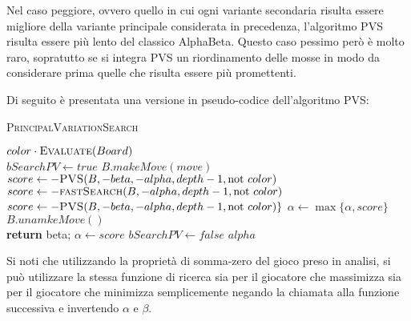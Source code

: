 \documentclass[a4paper]{article}
\begin{document}
Nel caso peggiore, ovvero quello in cui ogni variante secondaria risulta essere
migliore della variante principale considerata in precedenza, l'algoritmo PVS 
risulta essere più lento del classico AlphaBeta. Questo caso pessimo però è 
molto raro, sopratutto se si integra PVS un riordinamento delle mosse in modo
da considerare prima quelle che risulta essere più promettenti.

Di seguito è presentata una versione in pseudo-codice dell'algoritmo PVS:

\begin{algorithm}[H]
  \caption{\textsc{PrincipalVariationSearch}}
  \label{alg:pvs}
  \begin{algorithmic}[0]

        \State \Return $color \cdot \Call{Evaluate}{Board}$
      \EndIf
      \\
      \State $bSearchPV \gets true$
        \State $B.makeMove(move)$
          \State $score \gets -\Call{PVS}{B, -beta, -alpha, depth - 1, \textrm{not } color}$
        \Else
          \State $score \gets -\Call{fastSearch}{B, -alpha, depth - 1, \textrm{not } color}$
            \State $score \gets -\Call{PVS}{B, -beta, -alpha, depth - 1, \textrm{not } color}\}$
            \State $\alpha \gets \max\{\alpha, score\}$
          \EndIf
        \EndIf
        \State $B.unamkeMove()$
        \\
        \State \textbf{return} beta;
        \EndIf
          \State $\alpha \gets score$
        \EndIf
        \State $bSearchPV \gets false$
      \EndFor
      \State \Return $alpha$
    \EndFunction

  \end{algorithmic}
\end{algorithm}

Si noti che utilizzando la proprietà di somma-zero del gioco preso in analisi, 
si può utilizzare la stessa funzione di ricerca sia per il giocatore che 
massimizza sia per il giocatore che minimizza semplicemente negando la chiamata
alla funzione successiva e invertendo $\alpha$ e $\beta$.
\end{document}
